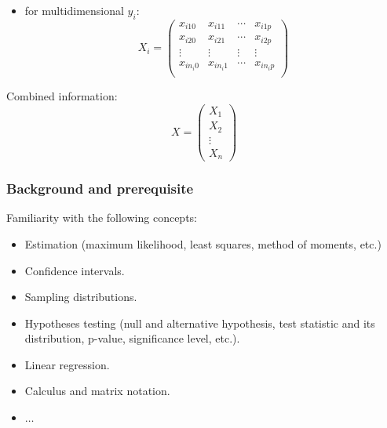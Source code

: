 \documentclass{beamer}
\begin{document}
\begin{frame}
\frametitle{}

\begin{itemize}
\item for multidimensional $y_i$:
$$X_i = \left(
\begin{array}{cccc}
x_{i10} & x_{i11} & \cdots & x_{i1p}\\
x_{i20} & x_{i21} & \cdots & x_{i2p}\\
\vdots & \vdots & \vdots & \vdots \\
x_{in_i0} & x_{in_i1} & \cdots & x_{in_ip}\\
\end{array} \right)$$
\end{itemize}

Combined information:
$$X = \left(
\begin{array}{c}
X_1 \\
X_2 \\
\vdots\\
X_n
\end{array} \right) $$
\end{frame}

\begin{frame}
\frametitle{Background and prerequisite}


Familiarity with the following concepts:
\begin{itemize}
\item Estimation (maximum likelihood, least squa\-res, method of moments, etc.)
\item Confidence intervals.
\item Sampling distributions.
\item Hypotheses testing (null and alternative hypothesis, test statistic and
its distribution, p-value, significance level, etc.).
\item Linear regression.
\item Calculus and matrix notation.
\item $\ldots$
\end{itemize}

\end{frame}
\end{document}
